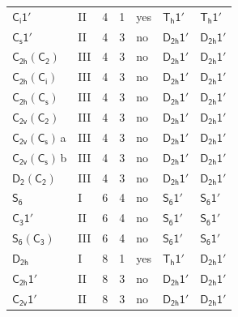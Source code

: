\documentclass[10pt,a4paper]{article}
\numberwithin{equation}{section}
\newcommand{\grp}[1]{\mathsf{#1}}
\newcommand{\clsletter}[1]{\,{\scriptsize\color{black!55}#1}}
\begin{document}
{\begin{longtable}{@{}llrrlll@{}}
\href{S2-1p.pdf}{$\grp{C_{i}1'}$} & II & 4 & 1 & yes & \href{Th-1p.pdf}{$\grp{T_{h}1'}$} & \href{Th-1p.pdf}{$\grp{T_{h}1'}$}\\
\href{C1v-1p.pdf}{$\grp{C_{s}1'}$} & II & 4 & 3 & no & \href{D2h-1p.pdf}{$\grp{D_{2h}1'}$} & \href{D2h-1p.pdf}{$\grp{D_{2h}1'}$}\\
\href{C2h-C2.pdf}{$\grp{C_{2h}}(\grp{C_{2}})$} & III & 4 & 3 & no & \href{D2h-1p.pdf}{$\grp{D_{2h}1'}$} & \href{D2h-1p.pdf}{$\grp{D_{2h}1'}$}\\
\href{C2h-S2.pdf}{$\grp{C_{2h}}(\grp{C_{i}})$} & III & 4 & 3 & no & \href{D2h-1p.pdf}{$\grp{D_{2h}1'}$} & \href{D2h-1p.pdf}{$\grp{D_{2h}1'}$}\\
\href{C2h-C1v.pdf}{$\grp{C_{2h}}(\grp{C_{s}})$} & III & 4 & 3 & no & \href{D2h-1p.pdf}{$\grp{D_{2h}1'}$} & \href{D2h-1p.pdf}{$\grp{D_{2h}1'}$}\\
\href{C2v-C2.pdf}{$\grp{C_{2v}}(\grp{C_{2}})$} & III & 4 & 3 & no & \href{D2h-1p.pdf}{$\grp{D_{2h}1'}$} & \href{D2h-1p.pdf}{$\grp{D_{2h}1'}$}\\
\href{C2v-C1v.pdf}{$\grp{C_{2v}}(\grp{C_{s}})$}\clsletter{a} & III & 4 & 3 & no & \href{D2h-1p.pdf}{$\grp{D_{2h}1'}$} & \href{D2h-1p.pdf}{$\grp{D_{2h}1'}$}\\
\href{C2v-C1v.pdf}{$\grp{C_{2v}}(\grp{C_{s}})$}\clsletter{b} & III & 4 & 3 & no & \href{D2h-1p.pdf}{$\grp{D_{2h}1'}$} & \href{D2h-1p.pdf}{$\grp{D_{2h}1'}$}\\
\href{D2-C2.pdf}{$\grp{D_{2}}(\grp{C_{2}})$} & III & 4 & 3 & no & \href{D2h-1p.pdf}{$\grp{D_{2h}1'}$} & \href{D2h-1p.pdf}{$\grp{D_{2h}1'}$}\\
\href{../../../rotation/data/pdf/S6.pdf}{$\grp{S_{6}}$} & I & 6 & 4 & no & \href{S6-1p.pdf}{$\grp{S_{6}1'}$} & \href{S6-1p.pdf}{$\grp{S_{6}1'}$}\\
\href{C3-1p.pdf}{$\grp{C_{3}1'}$} & II & 6 & 4 & no & \href{S6-1p.pdf}{$\grp{S_{6}1'}$} & \href{S6-1p.pdf}{$\grp{S_{6}1'}$}\\
\href{S6-C3.pdf}{$\grp{S_{6}}(\grp{C_{3}})$} & III & 6 & 4 & no & \href{S6-1p.pdf}{$\grp{S_{6}1'}$} & \href{S6-1p.pdf}{$\grp{S_{6}1'}$}\\
\href{../../../rotation/data/pdf/D2h.pdf}{$\grp{D_{2h}}$} & I & 8 & 1 & yes & \href{Th-1p.pdf}{$\grp{T_{h}1'}$} & \href{D2h-1p.pdf}{$\grp{D_{2h}1'}$}\\
\href{C2h-1p.pdf}{$\grp{C_{2h}1'}$} & II & 8 & 3 & no & \href{D2h-1p.pdf}{$\grp{D_{2h}1'}$} & \href{D2h-1p.pdf}{$\grp{D_{2h}1'}$}\\
\href{C2v-1p.pdf}{$\grp{C_{2v}1'}$} & II & 8 & 3 & no & \href{D2h-1p.pdf}{$\grp{D_{2h}1'}$} & \href{D2h-1p.pdf}{$\grp{D_{2h}1'}$}\\

\end{longtable}}
\end{document}
